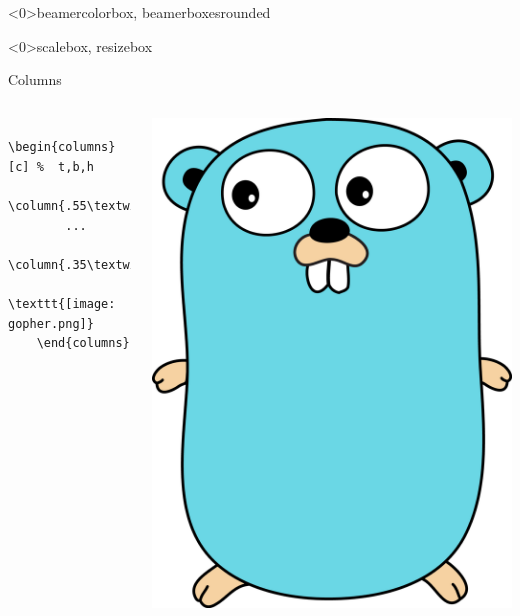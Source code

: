 \documentclass[xcolor=x11names, xcolor=table]{beamer}
\begin{document}
\begin{frame}<0>{beamercolorbox, beamerboxesrounded}
\end{frame}


\begin{frame}<0>{scalebox, resizebox}
\end{frame}


\begin{frame}[fragile, c]{Columns}
\begin{columns}[c]
\begin{verbatim}
    \begin{columns}[c] %  t,b,h
        \column{.55\textwidth}
        ...
        \column{.35\textwidth}
        \texttt{[image: gopher.png]}
    \end{columns}
\end{verbatim}
    \includegraphics[width=.8\linewidth]{img/gopher.png}
\end{columns}
\end{frame}
\end{document}
